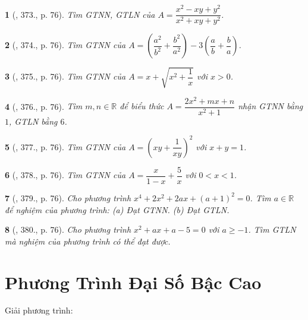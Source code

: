 \documentclass{article}
\newtheorem{baitoan}{}
\begin{document}
\begin{baitoan}[\cite{Binh_Toan_9_tap_2}, 373., p. 76]
	Tìm {\rm GTNN, GTLN} của $A = \dfrac{x^2 - xy + y^2}{x^2 + xy + y^2}$.
\end{baitoan}

\begin{baitoan}[\cite{Binh_Toan_9_tap_2}, 374., p. 76]
	Tìm {\rm GTNN} của $A = \left(\dfrac{a^2}{b^2} + \dfrac{b^2}{a^2}\right) - 3\left(\dfrac{a}{b} + \dfrac{b}{a}\right)$.
\end{baitoan}

\begin{baitoan}[\cite{Binh_Toan_9_tap_2}, 375., p. 76]
	Tìm {\rm GTNN} của $A = x + \sqrt{x^2 + \dfrac{1}{x}}$ với $x > 0$.
\end{baitoan}

\begin{baitoan}[\cite{Binh_Toan_9_tap_2}, 376., p. 76]
	Tìm $m,n\in\mathbb{R}$ để biểu thức $A = \dfrac{2x^2 + mx + n}{x^2 + 1}$ nhận {\rm GTNN} bằng $1$, {\rm GTLN} bằng $6$.
\end{baitoan}

\begin{baitoan}[\cite{Binh_Toan_9_tap_2}, 377., p. 76]
	Tìm {\rm GTNN} của $A = \left(xy + \dfrac{1}{xy}\right)^2$ với $x + y = 1$.
\end{baitoan}

\begin{baitoan}[\cite{Binh_Toan_9_tap_2}, 378., p. 76]
	Tìm {\rm GTNN} của $A = \dfrac{x}{1 - x} + \dfrac{5}{x}$ với $0 < x < 1$.
\end{baitoan}

\begin{baitoan}[\cite{Binh_Toan_9_tap_2}, 379., p. 76]
	Cho phương trình $x^4 + 2x^2 + 2ax + (a + 1)^2 = 0$. Tìm $a\in\mathbb{R}$ để nghiệm của phương trình: (a) Đạt {\rm GTNN}. (b) Đạt {\rm GTLN}.
\end{baitoan}

\begin{baitoan}[\cite{Binh_Toan_9_tap_2}, 380., p. 76]
	Cho phương trình $x^2 + ax + a - 5 = 0$ với $a\ge-1$. Tìm {\rm GTLN} mà nghiệm của phương trình có thể đạt được.
\end{baitoan}


\section{Phương Trình Đại Số Bậc Cao}
Giải phương trình:
\end{document}
